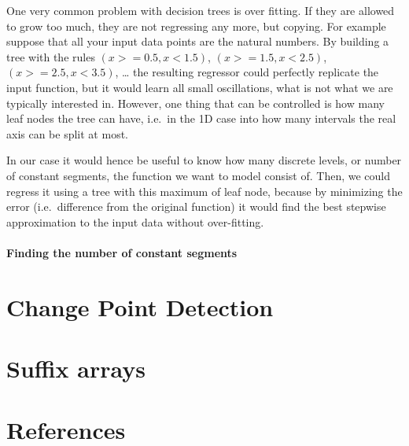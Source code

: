 \documentclass[12pt,a4paper]{article}
\begin{document}
One very common problem with decision trees is over fitting. If they are
allowed to grow too much, they are not regressing any more, but copying.
For example suppose that all your input data points are the natural
numbers. By building a tree with the rules \((x >= 0.5, x <1.5)\),
\((x >= 1.5, x <2.5)\), \((x >= 2.5, x <3.5)\), \ldots{} the resulting
regressor could perfectly replicate the input function, but it would
learn all small oscillations, what is not what we are typically
interested in. However, one thing that can be controlled is how many
leaf nodes the tree can have, i.e.~in the 1D case into how many
intervals the real axis can be split at most.

In our case it would hence be useful to know how many discrete levels,
or number of constant segments, the function we want to model consist
of. Then, we could regress it using a tree with this maximum of leaf
node, because by minimizing the error (i.e.~difference from the original
function) it would find the best stepwise approximation to the input
data without over-fitting.

\hypertarget{finding-the-number-of-constant-segments}{%
\paragraph{Finding the number of constant
segments}\label{finding-the-number-of-constant-segments}}

\hypertarget{change-point-detection}{%
\section{Change Point Detection}\label{change-point-detection}}

\hypertarget{suffix-arrays}{%
\section{Suffix arrays}\label{suffix-arrays}}

\hypertarget{references}{%
\section*{References}\label{references}}

\hypertarget{refs}{}
\printbibliography
\end{document}
